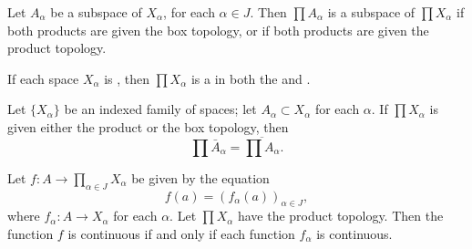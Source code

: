 \documentclass[../main.tex]{subfiles}
\begin{document}
\begin{theorem}{}{}
Let $A_{\alpha}$ be a subspace of $X_{\alpha}$, for each $\alpha \in J$. Then $\prod A_{\alpha}$ is a subspace of $\prod X_{\alpha}$ if both products are given the box topology, or if both products are given the product topology.
\end{theorem}
\begin{theorem}{}{}
If each space $X_\alpha$ is , then $\prod X_\alpha$ is a  in both the  and .
\end{theorem}
\begin{theorem}{}{}
Let $\{X_{\alpha}\}$ be an indexed family of spaces; let $A_{\alpha} \subset X_{\alpha}$ for each $\alpha$. If $\prod X_{\alpha}$ is given either the product or the box topology, then
\[
\prod \bar{A}_{\alpha} = \overline{\prod A_{\alpha}}.
\]
\end{theorem}
\begin{theorem}{}{}
Let $f: A \to \prod_{\alpha \in J} X_{\alpha}$ be given by the equation
\[f(a) = (f_{\alpha}(a))_{\alpha \in J},\]
where $f_{\alpha}: A \to X_{\alpha}$ for each $\alpha$. Let $\prod X_{\alpha}$ have the product topology. Then the function $f$ is continuous if and only if each function $f_{\alpha}$ is continuous.
\end{theorem}
\end{document}
